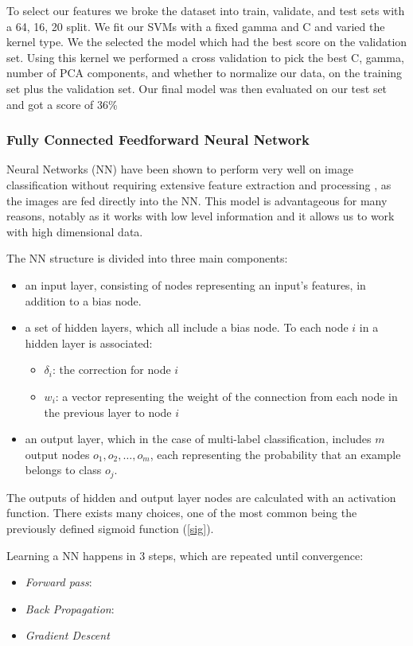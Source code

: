 \documentclass[conference]{IEEEtran}
\begin{document}
To select our features we broke the dataset into train, validate, and test sets with a 64, 16, 20 split. We fit our SVMs with a fixed gamma and C and varied the kernel type. We the selected the model which had the best score on the validation set. Using this kernel we performed a cross validation to pick the best C, gamma, number of PCA components, and whether to normalize our data, on the training set plus the validation set. Our final model was then evaluated on our test set and got a score of 36\%


\subsubsection{Fully Connected Feedforward Neural Network}

Neural Networks (NN) have been shown to perform very well on image classification without requiring extensive feature extraction and processing \cite{LeCun90}, as the images are fed directly into the NN. This model is advantageous for many reasons, notably as it works with low level information and it allows us to work with high dimensional data.

The NN structure is divided into three main components: 
\begin{itemize}
\item an input layer, consisting of nodes representing an input's features, in addition to a bias node.
\item a set of hidden layers, which all include a bias node. To each node $i$ in a hidden layer is associated:
\begin{itemize}
\item $\delta_i$: the correction for node $i$
\item $w_i$: a vector representing the weight of the connection from each node in the previous layer to node $i$
\end{itemize}
\item an output layer, which in the case of multi-label classification, includes $m$ output nodes $o_1,o_2,\dots,o_m$, each representing the probability that an example belongs to class $o_j$.
\end{itemize}

The outputs of hidden and output layer nodes are calculated with an activation function. There exists many choices, one of the most common being the previously defined sigmoid function (\ref{sig}).



Learning a NN happens in 3 steps, which are repeated until convergence:
\begin{itemize}
\item \emph{Forward pass}:
\item \emph{Back Propagation}:
\item \emph{Gradient Descent}
\end{itemize}
\end{document}
